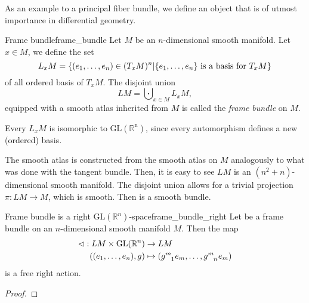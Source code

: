 As an example to a principal fiber bundle, we define an object that is of utmost importance in differential geometry.
\begin{definition}{Frame bundle}{frame_bundle}
    Let \(M\) be an \(n\)-dimensional smooth manifold. Let \(x \in M\), we define the set
    \begin{equation*}
        L_xM = \set*{\left(e_1, \dots, e_n\right) \in (T_xM)^n | \set*{e_1, \dots, e_n} \text{ is a basis for } T_xM}
    \end{equation*}
    of all ordered basis of \(T_xM\). The disjoint union
    \begin{equation*}
        LM = \bigcupdot_{x \in M} L_xM,
    \end{equation*}
    equipped with a smooth atlas inherited from \(M\) is called the \emph{frame bundle} on \(M\).
\end{definition}
\begin{remark}
    Every \(L_xM\) is isomorphic to \(\mathrm{GL(\mathbb{R}^n)}\), since every automorphism defines a new (ordered) basis.
\end{remark}
\begin{remark}
    The smooth atlas is constructed from the smooth atlas on \(M\) analogously to what was done with the tangent bundle. Then, it is easy to see \(LM\) is an \((n^2 + n)\)-dimensional smooth manifold. The disjoint union allows for a trivial projection \(\pi : LM \to M\), which is smooth. Then  is a smooth bundle.
\end{remark}

\begin{lemma}{Frame bundle is a right \(\mathrm{GL}(\mathbb{R}^n)\)-space}{frame_bundle_right}
    Let  be a frame bundle on an \(n\)-dimensional smooth manifold \(M\). Then the map
    \begin{align*}
        \ract : LM \times \mathrm{GL}(\mathbb{R}^n) &\to LM\\
                           \left((e_1,\dots,e_n),g\right) &\mapsto (g\indices{^m_1}e_m, \dots, g\indices{^m_n}e_m)
    \end{align*}
    is a free right action.
\end{lemma}
\begin{proof}
    \todo
\end{proof}

